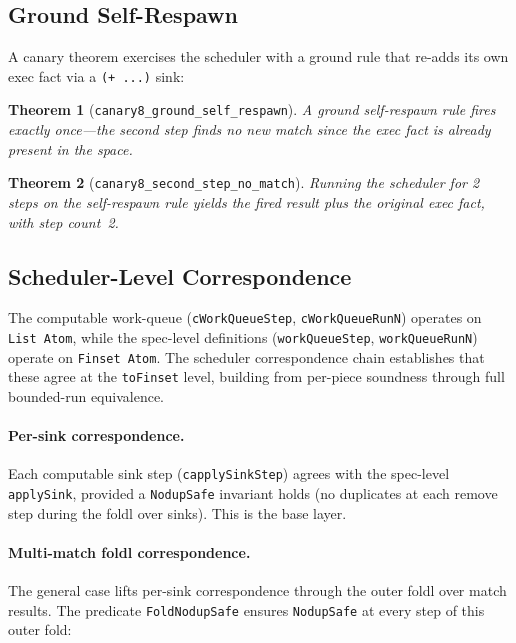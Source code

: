 \documentclass[11pt]{article}
\newtheorem{theorem}{Theorem}[section]
\theoremstyle{definition}
\theoremstyle{remark}
\begin{document}
\subsection{Ground Self-Respawn}

A canary theorem exercises the scheduler with a ground rule that
re-adds its own exec fact via a \texttt{(+ ...)} sink:

\begin{theorem}[\texttt{canary8\_ground\_self\_respawn}]
A ground self-respawn rule fires exactly once---the second step finds
no new match since the exec fact is already present in the space.
\end{theorem}

\begin{theorem}[\texttt{canary8\_second\_step\_no\_match}]
Running the scheduler for 2 steps on the self-respawn rule yields
the fired result plus the original exec fact, with step count~2.
\end{theorem}

\subsection{Scheduler-Level Correspondence}
\label{sec:schedulercorr}

The computable work-queue (\texttt{cWorkQueueStep}, \texttt{cWorkQueueRunN})
operates on \texttt{List Atom}, while the spec-level definitions
(\texttt{workQueueStep}, \texttt{workQueueRunN}) operate on
\texttt{Finset Atom}.  The scheduler correspondence chain establishes
that these agree at the \texttt{toFinset} level, building from per-piece
soundness through full bounded-run equivalence.

\paragraph{Per-sink correspondence.}
Each computable sink step (\texttt{capplySinkStep}) agrees with the
spec-level \texttt{applySink}, provided a \texttt{NodupSafe} invariant
holds (no duplicates at each remove step during the foldl over sinks).
This is the base layer.

\paragraph{Multi-match foldl correspondence.}
The general case lifts per-sink correspondence through the outer foldl
over match results.  The predicate \texttt{FoldNodupSafe} ensures
\texttt{NodupSafe} at every step of this outer fold:
\end{document}
